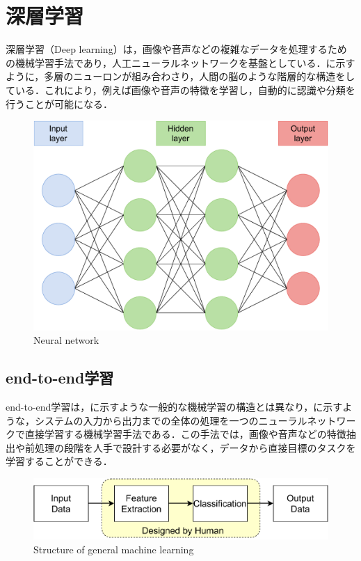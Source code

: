 
\section{深層学習}

  深層学習（Deep learning）は，画像や音声などの複雑なデータを処理するための機械学習手法であり，人工ニューラルネットワークを基盤としている．に示すように，多層のニューロンが組み合わさり，人間の脳のような階層的な構造をしている．これにより，例えば画像や音声の特徴を学習し，自動的に認識や分類を行うことが可能になる．

  \begin{figure}[h]
    \centering
    \includegraphics[keepaspectratio, scale=0.45] {images/pdf/deep_neural_network}
    \caption{Neural network}
    \label{Fig:deep_neural_network}
  \end{figure}

\newpage

\subsection{end-to-end学習}

  end-to-end学習は，に示すような一般的な機械学習の構造とは異なり，に示すような，システムの入力から出力までの全体の処理を一つのニューラルネットワークで直接学習する機械学習手法である．この手法では，画像や音声などの特徴抽出や前処理の段階を人手で設計する必要がなく，データから直接目標のタスクを学習することができる．

  \begin{figure}[h]
    \centering
    \includegraphics[keepaspectratio, scale=0.80] {images/pdf/RobotGuidance_about_general_structure}
    \caption{Structure of general machine learning}
    \label{Fig:Structure of general machine learning}
  \end{figure}

